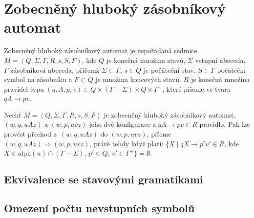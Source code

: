 
\chapter{Zobecněný hluboký zásobníkový automat}


\begin{Def}
Zobecněný hluboký zásobníkový automat je uspořádaná sedmice $M = (Q,\Sigma,\Gamma, R, s, S, F)$, 
kde $Q$ je konečná množina stavů, $\Sigma$ vstupní abeceda, $\Gamma$ zásobníková abeceda, přičemž $\Sigma \subset \Gamma$,
$s \in Q$ je počáteční stav, $S \in \Gamma$ počáteční symbol na zásobníku a $F \subset Q$ je množina
koncových stavů. $R$ je konečná množina pravidel typu $(q, A, p, v) \in Q \times (\Gamma - \Sigma) \times Q \times {\Gamma}^+$, které píšeme ve tvaru $qA \rightarrow pv$. 
\end{Def}

\begin{Def}
Nechť $M = (Q,\Sigma,\Gamma, R, s, S, F)$ je zobecněný hluboký zásobníkový automat, $(w,q,uAz)$ a $(w,p,uvz)$ jeho dvě konfigurace a $qA \rightarrow pv \in R$ pravidlo. Pak lze provést přechod z~$(w,q,uAz)$ do $(w,p,uvz)$, píšeme $(w,q,uAz) {\Rightarrow} (w,p,uvz)$, právě tehdy když platí: $\{X \mid qX \rightarrow p'v' \in R$, kde $X \in \mathrm{alph}(u) \cap (\Gamma - \Sigma)$, $p' \in Q$, $v' \in {\Gamma}^+ \} = \emptyset$.
\end{Def}

 \section{Ekvivalence se stavovými gramatikami} \label{sec_ekv_state_grammars}


\section{Omezení počtu nevstupních symbolů}

